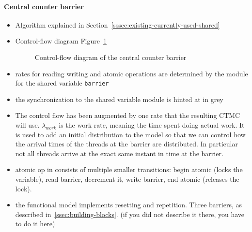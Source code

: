 \documentclass[a4paper, 10pt]{article}
\begin{document}
\begin{enumerate}
\paragraph{Central counter barrier}
\label{sssec:analysis-modelchecking-modelling-central-counter}
\begin{itemize}
	\item Algorithm explained in Section~\ref{sssec:existing-currently-used-shared}
	\item Control-flow diagram Figure~\ref{fig:central-counter-control-flow}
		\begin{figure}[htbp]
			\centering
			
			\caption{Control-flow diagram of the central counter barrier}
			\label{fig:central-counter-control-flow}
		\end{figure}
	\item rates for reading writing and atomic operations are determined by the module for the shared variable \texttt{barrier}
	\item the synchronization to the shared variable module is hinted at in grey
	\item The control flow has been augmented by one rate that the resulting CTMC will use. $\lambda_{work}$ is the work rate, meaning the time spent doing actual work. It is used to add an initial distribution to the model so that we can control how the arrival times of the threads at the barrier are distributed. In particular not all threads arrive at the exact same instant in time at the barrier.
	\item atomic op in consists of multiple smaller transitions: begin atomic (locks the variable), read barrier, decrement it, write barrier, end atomic (releases the lock).
	\item the functional model implements resetting and repetition. Three barriers, as described in~\ref{ssec:building-blocks}. (if you did not describe it there, you have to do it here)
\end{itemize}


\end{enumerate}
\end{document}
